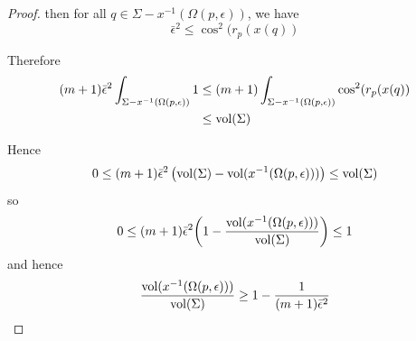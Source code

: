 \documentclass{amsart}
\theoremstyle{definition}
\theoremstyle{remark}
\begin{document}
\begin{proof}
\noindent then for all $q \in\Sigma-x^{-1}(\Omega(p,\epsilon))$, we have
$$ \bar\epsilon^2 \leq \cos^2(r_p(x(q))$$


Therefore 
 $$
 \begin{aligned}
(m+1)\bar\epsilon^2\int_{\Sigma-x^{-1}(\Omega(p,\epsilon))} 1&\leq 
(m+1)\int_{\Sigma-x^{-1}(\Omega(p,\epsilon))} \cos^2(r_p(x(q))\\&\leq {\rm vol}(\Sigma)
\end{aligned}
$$

Hence
$$
0 \leq(m+1)\bar \epsilon^2\left({\rm vol}(\Sigma)-{\rm vol}(x^{-1}(\Omega(p,\epsilon)))\right)\leq {\rm vol}(\Sigma)
$$
\noindent so
$$
0 \leq (m+1)\bar \epsilon^2\bigg(1- \frac{{\rm vol}(x^{-1}(\Omega(p,\epsilon)))}{{\rm vol}(\Sigma)}\bigg)\leq 1
$$
\noindent and hence
$$
\frac{{\rm vol}(x^{-1}(\Omega(p,\epsilon)))}{{\rm vol}(\Sigma)}\geq 1-\frac{1}{(m+1)\bar\epsilon^2}
$$
\end{proof}
\end{document}

